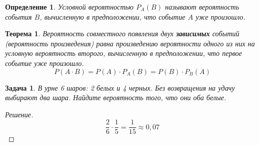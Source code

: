 \documentclass[a4paper,12pt]{article}
\newtheorem{define}{Определение}
\newtheorem{theorem}{Теорема}
\newtheorem{problem}{Задача}
\begin{document}
\begin{define}
Условной вероятностью $P_A(B)$ называют вероятность события $B$, вычисленную в предположении, что событие $A$ уже произошло.
\end{define}

\begin{theorem}
Вероятность совместного появления двух \textbf{зависимых} событий (вероятность произведения) равна произведению вероятности одного из них на условную вероятность второго, вычисленную в предположении, что первое событие уже произошло.
$$P(A\cdot{}B)=P(A)\cdot{}P_A(B)=P(B)\cdot{}P_B(A)$$
\end{theorem}

\begin{problem}
В урне 6 шаров: 2 белых и 4 черных. Без возвращения на удачу выбирают два шара. Найдите вероятность того, что они оба белые.
\end{problem}
\begin{proof}[Решение]
	$$\frac{2}{6}\cdot{}\frac{1}{5}=\frac{1}{15}\approx0,07$$
\end{proof}
\end{document}
